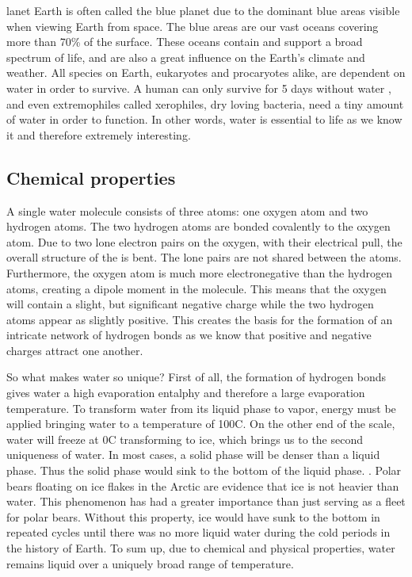 \noindent
{}lanet Earth is often called the blue planet due to the dominant blue areas visible when viewing Earth from space.
The blue areas are our vast oceans covering more than 70\% \cite{WikiEarth} of the surface.
These oceans contain and support a broad spectrum of life, and are also a great influence on the Earth's climate and weather.
All species on Earth, eukaryotes and procaryotes alike, are dependent on water in order to survive.
A human can only survive for 5 days without water \cite{SurviveWater}, and even extremophiles called xerophiles, dry loving bacteria, need a tiny amount of water in order to function.
In other words, water is essential to life as we know it and therefore extremely interesting. 

\subsection{Chemical properties}
A single water molecule consists of three atoms: one oxygen atom and two hydrogen atoms.
The two hydrogen atoms are bonded covalently to the oxygen atom.
Due to two lone electron pairs on the oxygen, with their electrical pull, the overall structure of the is bent.
The lone pairs are not shared between the atoms.
Furthermore, the oxygen atom is much more electronegative than the hydrogen atoms, creating a dipole moment in the molecule.
This means that the oxygen will contain a slight, but significant negative charge while the two hydrogen atoms appear as slightly positive.
This creates the basis for the formation of an intricate network of hydrogen bonds as we know that positive and negative charges attract one another.  

So what makes water so unique?
First of all, the formation of hydrogen bonds gives water a high evaporation entalphy and therefore a large evaporation temperature.
To transform water from its liquid phase to vapor, energy must be applied bringing water to a temperature of 100\degree C.
On the other end of the scale, water will freeze at 0\degree C transforming to ice, which brings us to the second uniqueness of water.
In most cases, a solid phase will be denser than a liquid phase.
Thus the solid phase would sink to the bottom of the liquid phase. \cite{SolidWater}.
Polar bears floating on ice flakes in the Arctic are evidence that ice is not heavier than water.
This phenomenon has had a greater importance than just serving as a fleet for polar bears.
Without this property, ice would have sunk to the bottom in repeated cycles until there was no more liquid water during the cold periods in the history of Earth.
To sum up, due to chemical and physical properties, water remains liquid over a uniquely broad range of temperature.

